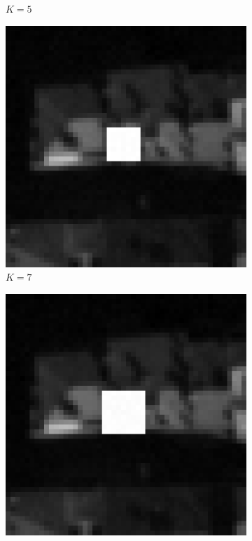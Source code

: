 \begin{figure}[H]
\begin{subfigure}{.15\linewidth}
		\caption{{$K=5$}}
	\end{subfigure} 
	\begin{subfigure}{.15\linewidth}
		\includegraphics[width=1\textwidth]{img/testOcclusion3}
		\caption{{$K=7$}}
	\end{subfigure}
	\begin{subfigure}{.15\linewidth}
		\includegraphics[width=1\textwidth]{img/testOcclusion4}

\end{subfigure}
\end{figure}
